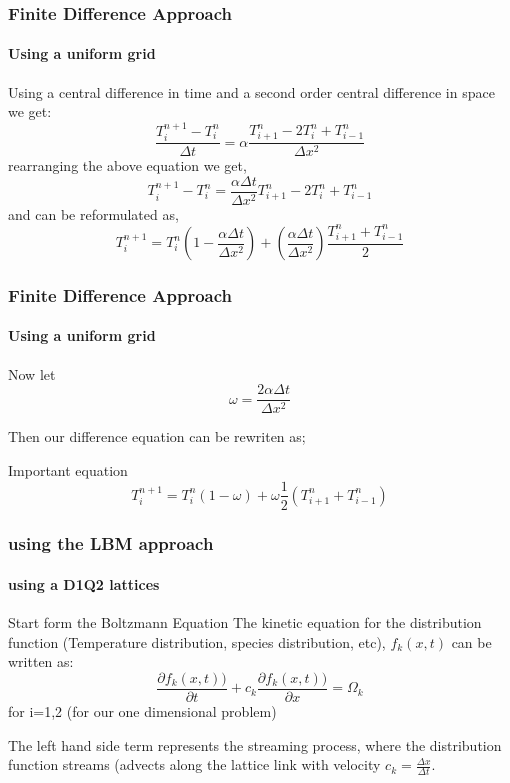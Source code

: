 \documentclass[12pt]{beamer}
\begin{document}
\begin{frame}
  \frametitle{Finite Difference Approach}
  \framesubtitle{Using a uniform grid}
  Using a central difference in time and a second order central difference in space we get:
  \begin{equation}
   \frac{T_i^{n+1}-T_i^{n}}{\Delta t} = \alpha \frac{T_{i+1}^n-2T_i^n+T_{i-1}^n}{\Delta x^2}
  \end{equation}
  rearranging the above equation we get,
  \begin{equation}
    T_i^{n+1}-T_i^{n} = \frac{\alpha\Delta t}{{\Delta x^2}} T_{i+1}^n-2T_i^n+T_{i-1}^n
  \end{equation}
  and can be reformulated as,
  \begin{equation}
   T_i^{n+1}=T_i^{n} \left ( 1-\frac{\alpha\Delta t}{{\Delta x^2}} \right ) + \left (\frac{\alpha\Delta t}{{\Delta x^2}} \right ) \frac{T_{i+1}^n+T_{i-1}^n}{2}
  \end{equation}
\end{frame}

\begin{frame}
  \frametitle{Finite Difference Approach}
  \framesubtitle{Using a uniform grid}

  Now let 
  \begin{equation}
   \omega = \frac{2\alpha \Delta t}{\Delta x^2}
  \end{equation}

  Then our difference equation can be rewriten as;
  \begin{alertblock}{Important equation}
  \begin{equation}
   T_i^{n+1}=T_i^{n} \left (1 - \omega \right ) + \omega \frac{1}{2} \left ( T_{i+1}^n+T_{i-1}^n \right )
  \end{equation} 
  \end{alertblock}
\end{frame}

\begin{frame}
  \frametitle{using the LBM approach}
  \framesubtitle{using a D1Q2 lattices}
  \begin{block}{Start form the Boltzmann Equation}
  The kinetic equation for the distribution function (Temperature distribution, 
  species distribution, etc), $f_k(x,t)$ can be written as:
  \begin{equation} \nonumber
    \frac{\partial f_k(x,t))}{\partial t}+c_k \frac{\partial f_k(x,t))}{\partial x} = \Omega_k
  \end{equation} 
  for i=1,2 (for our one dimensional problem)
  \end{block}
  The left hand side term represents the streaming process, where the distribution 
  function streams (advects along the lattice link with velocity
  $c_k=\frac{\Delta x}{\Delta t}$.
\end{frame}
\end{document}
